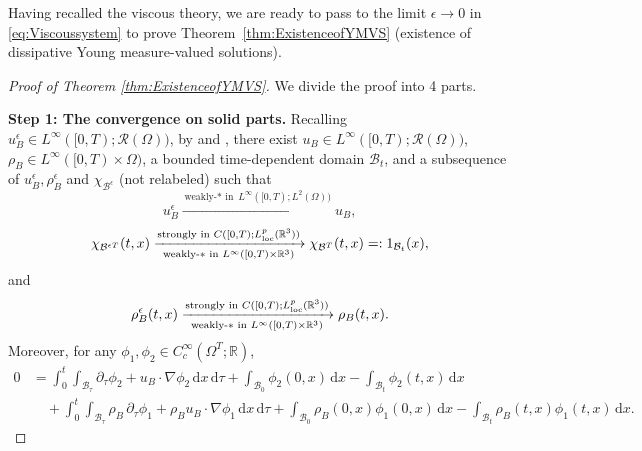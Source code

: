 \documentclass[11pt,twoside,reqno]{amsart}
\numberwithin{equation}{section}
\numberwithin{figure}{section}
\begin{document}
Having recalled the viscous theory, we are ready to pass to the limit $\epsilon \to 0$ in \eqref{eq:Viscoussystem} to prove Theorem~\ref{thm:ExistenceofYMVS} (existence of dissipative Young measure-valued solutions).



\begin{proof}[Proof of Theorem \ref{thm:ExistenceofYMVS}]
We divide the proof into 4 parts. 

\smallskip
\textbf{Step 1: The convergence on solid parts.} 
Recalling $u^\epsilon_B\in L^\infty([0,T);\mathcal{R}(\Omega))$, by \cite[Proposition 3.4]{gerard2014existence} and \cite[Theorem II.4]{diperna1989ordinary}, there exist $u_B\in L^\infty([0,T);\mathcal{R}(\Omega))$, $\rho_B\in L^\infty([0,T)\times\Omega)$, a bounded time-dependent domain $\mathcal{B}_t$, and a subsequence of $u^\epsilon_B,\rho^\epsilon_B$ and $\chi_{\mathcal{B}^\epsilon}$ (not relabeled) such that 
\begin{equation}\label{eq:SolidConvergence1}
    u_B^\epsilon \xrightarrow{\text{weakly-$*$ in }L^\infty([0,T);L^2(\Omega))} u_B,
\end{equation}
\begin{equation}\label{eq:convergenceofB}
    \chi_{\mathcal{B}^{\epsilon T}}(t,x) 
    \xrightarrow[\text{weakly-$*$ in }L^\infty([0,T)\times \mathbb{R}^3 )]{\text{strongly in } C([0,T);L^p_{\text{loc}}(\mathbb{R}^3 ))} 
    \chi_{\mathcal{B}^T}(t,x)=:1_{\mathcal{B}_t}(x),
\end{equation}
and 
\begin{equation}\label{eq:SolidConvergence111}
     \rho_B^\epsilon(t,x) 
     \xrightarrow[\text{weakly-$*$ in }L^\infty([0,T)\times \mathbb{R}^3 )]{\text{strongly in } C([0,T);L^p_{\text{loc}}(\mathbb{R}^3 ))} 
     \rho_B(t,x).
\end{equation}
Moreover, for any $\phi_1,\phi_2\in C_c^\infty(\Omega^T;\mathbb{R})$,
\begin{equation}\label{eq:ConvergenceofSolidDensity} 
\begin{aligned}
0&=\int_0^t\!\!\int_{\mathcal{B}_\tau}\partial_\tau\phi_2+u_B\cdot\nabla\phi_2\,\mathrm{d}x\,\mathrm{d}\tau
+\int_{\mathcal{B}_0}\phi_2(0,x)\,\mathrm{d}x
-\int_{\mathcal{B}_t}\phi_2(t,x)\,\mathrm{d}x\\
&\quad+\int_0^t\!\!\int_{\mathcal{B}_\tau}\rho_B\,\partial_\tau\phi_1+\rho_B u_B\cdot\nabla\phi_1\,\mathrm{d}x\,\mathrm{d}\tau
+\int_{\mathcal{B}_0}\rho_B(0,x)\phi_1(0,x)\,\mathrm{d}x
-\int_{\mathcal{B}_t}\rho_B(t,x)\phi_1(t,x)\,\mathrm{d}x.
\end{aligned}
\end{equation}




\end{proof}
\end{document}
